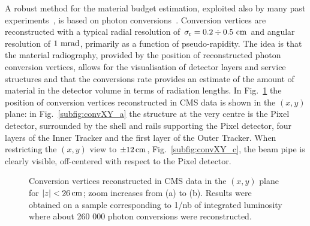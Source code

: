 \documentclass[a4paper]{jpconf}
\begin{document}
A robust method for the material budget estimation, exploited also by many
past experiments~\cite{steve}, is based on photon conversions~\cite{TRK-10-003}. 
Conversion vertices are reconstructed with a typical radial resolution of $\rm \sigma_r = 0.2 \div 0.5~cm$ and  angular resolution of  $1~{\rm mrad}$, primarily
as a function of pseudo-rapidity.
The idea is that the
material radiography, provided by the position of reconstructed photon
conversion vertices, allows for the visualisation of detector layers
and service structures and that the conversions rate provides an estimate of the amount of material in the
detector volume in terms of radiation lengths.
In Fig.~\ref{fig:convXY} the position of conversion vertices reconstructed in CMS data is shown in the $(x,y)$ plane:
in Fig.~\ref{subfig:convXY_a} the structure at the very centre is the Pixel detector,
surrounded by the shell and rails supporting the Pixel detector, four layers of the Inner Tracker and the first layer of the Outer Tracker.
When restricting the $(x,y)$ view to $\pm 12\rm \, cm$, Fig.~\ref{subfig:convXY_c}, the beam pipe is clearly visible, off-centered with respect to
the Pixel detector. 
%
\begin{figure}[t!]
  \begin{center}
    \caption{Conversion vertices reconstructed in CMS data in the $(x,y)$ plane for $|z|<26\rm \, cm$; zoom increases from (a) to (b). 
    Results were obtained on a sample corresponding to 1/nb of integrated luminosity where about 260 000 photon conversions were reconstructed. 
}
\label{fig:convXY}
\end{center}
\end{figure}
\end{document}
